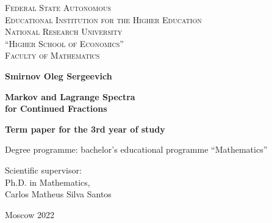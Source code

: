 \begin{center}
	{\scshape Federal State Autonomous\\
		Educational Institution for the Higher Education\\
		National Research University\\
		``Higher School of Economics''\\[1ex]
		Faculty of Mathematics\par}
	
	\par\vfill
	
	\textbf{\large Smirnov Oleg Sergeevich}
	
	\vspace{1.5cm}
	
	{\Large\bfseries
		Markov and Lagrange Spectra\\ for Continued Fractions
		\par}
	
	\vspace{1.5cm}
	
	\textbf{\large Term paper for the 3rd year of study}
	
	\vspace{1cm}
	
	Degree programme: bachelor's educational programme ``Mathematics''
	\par\vfill
	\noindent\hspace{0.52\textwidth}\parbox[t]{0.48\textwidth}{%
		Scientific supervisor:\\[3pt]
		Ph.D. in Mathematics,\\
		Carlos Matheus Silva Santos\\[2ex]
	}%
	\par\vfill
	Moscow 2022
\end{center}
\thispagestyle{empty}
